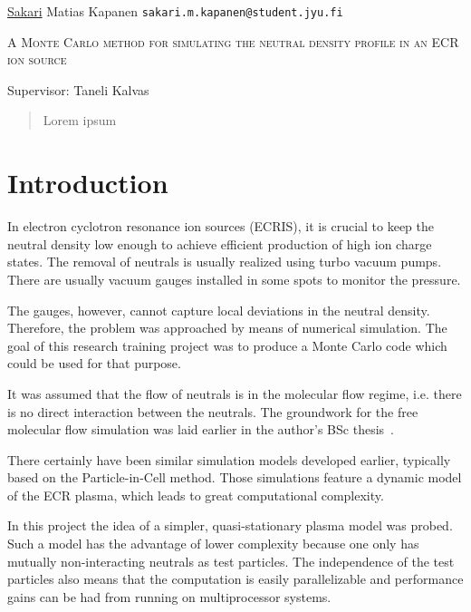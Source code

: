 \documentclass[a4paper,twoside,12pt]{article}
\begin{document}
\thispagestyle{empty}
\begin{flushleft}
 \underline{Sakari} Matias Kapanen\hfill
 \texttt{sakari.m.kapanen@student.jyu.fi}
\end{flushleft}
\vfill
\begin{center}
\textsc{\LARGE A Monte Carlo method for simulating the neutral density profile in an ECR ion source}
\end{center}
\vfill
Supervisor: Taneli Kalvas\\
\vfill
\begin{abstract}
 \noindent
    Lorem ipsum
\end{abstract}
\clearpage%

\setlength{\parindent}{0pt}
\setlength{\parskip}{12pt}

\setcounter{page}{1}

\section{Introduction}
In electron cyclotron resonance ion sources (ECRIS), it is crucial to keep the neutral density low enough to achieve efficient production of high ion charge states. The removal of neutrals is usually realized using turbo vacuum pumps. There are usually vacuum gauges installed in some spots to monitor the pressure.

The gauges, however, cannot capture local deviations in the neutral density. Therefore, the problem was approached by means of numerical simulation. The goal of this research training project was to produce a Monte Carlo code which could be used for that purpose.

It was assumed that the flow of neutrals is in the molecular flow regime, i.e. there is no direct interaction between the neutrals. The groundwork for the free molecular flow simulation was laid earlier in the author's BSc thesis~\cite{kapanen:bsc}.

There certainly have been similar simulation models developed earlier, typically based on the Particle-in-Cell method. Those simulations feature a dynamic model of the ECR plasma, which leads to great computational complexity.

In this project the idea of a simpler, quasi-stationary plasma model was probed. Such a model has the advantage of lower complexity because one only has mutually non-interacting neutrals as test particles. The independence of the test particles also means that the computation is easily parallelizable and performance gains can be had from running on multiprocessor systems.
\end{document}
